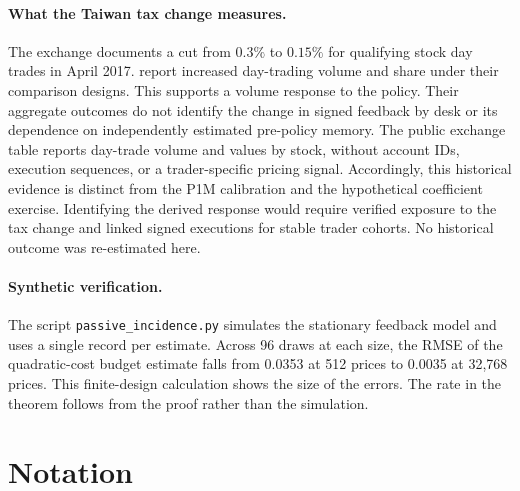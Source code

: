 \documentclass[12pt]{article}
\theoremstyle{definition}
\theoremstyle{remark}
\begin{document}
\paragraph{What the Taiwan tax change measures.}
The exchange documents a cut from $0.3\%$ to $0.15\%$ for qualifying stock day
trades in April 2017. \citet{wuwang2020} report increased day-trading volume and
share under their comparison designs. This supports a volume response to the
policy. Their aggregate outcomes do not identify the change in signed
feedback by desk or its dependence on independently estimated pre-policy
memory. The public exchange table reports day-trade volume and values by stock,
without account IDs, execution sequences, or a trader-specific pricing signal.
Accordingly, this historical evidence is distinct from the P1M calibration and
the hypothetical coefficient exercise. Identifying the derived response would
require verified exposure to the tax change and linked signed executions for
stable trader cohorts. No historical outcome was re-estimated here.

\paragraph{Synthetic verification.} The script \nolinkurl{passive_incidence.py} simulates the stationary feedback model and uses a single record per estimate. Across 96 draws at each size, the RMSE of the quadratic-cost budget estimate falls from 0.0353 at 512 prices to 0.0035 at 32,768 prices. This finite-design calculation shows the size of the errors. The rate in the theorem follows from the proof rather than the simulation.

\section{Notation}\label{app:notation}
\end{document}
